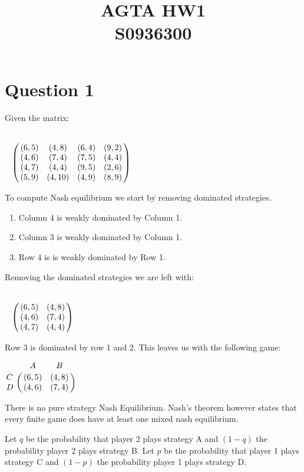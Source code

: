 \documentclass[11pt]{article}
\begin{document}
\title{AGTA HW1 \\ S0936300}

\maketitle

\section{Question 1}

Given the matrix: 

\begin{center}
$ \bordermatrix{~ & ~    & ~    & ~ & ~    \cr 
				~ & (6, 5) & (4, 8) & (6, 4) & (9, 2) \cr 
				~ & (4, 6) & (7, 4) & (7, 5) & (4, 4) \cr
				~ & (4, 7) & (4, 4) & (9, 5) & (2, 6) \cr
				~ & (5, 9) & (4, 10)& (4, 9) & (8, 9) \cr}$ 
\end{center}
				
To compute Nash equilibrium we start by removing dominated strategies. 

\begin{enumerate}
\item Column 4 is weakly dominated by Column 1.
\item Column 3 is weakly dominated by Column 1.
\item Row 4 is is weakly dominated by Row 1.
\end{enumerate}

Removing the dominated strategies we are left with:

\begin{center}
$\bordermatrix{~ & ~      & ~  \cr
			   ~ & (6, 5) & (4, 8) \cr
			   ~ & (4, 6) & (7, 4) \cr
			   ~ & (4, 7) & (4, 4) \cr} $
\end{center}
			   
Row 3 is dominated by row 1 and 2. This leaves us with the following game:

\begin{center}
$\bordermatrix{~ & A      & B  \cr
			   C & (6, 5) & (4, 8) \cr
			   D & (4, 6) & (7, 4) \cr} $
\end{center}

There is no pure strategy Nash Equilibrium. Nash's theorem however states that every finite game does have at least one mixed nash equilibrium.

Let $q$ be the probability that player 2 plays strategy A and $(1 - q)$ the probability player 2 plays strategy B.
Let $p$ be the probability that player 1 plays strategy C and $(1 - p)$ the probability player 1 plays strategy D.
\end{document}
